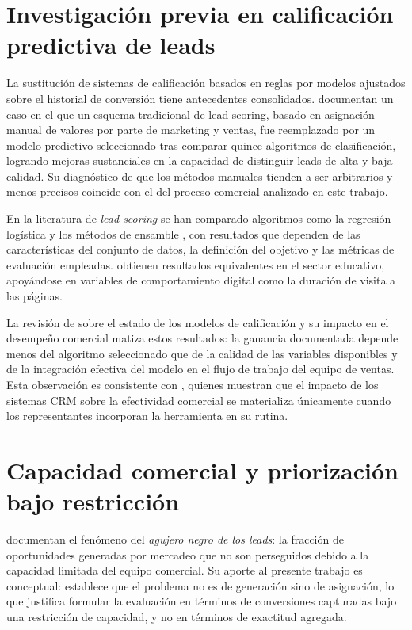 
\section{Investigación previa en calificación predictiva de leads}

La sustitución de sistemas de calificación basados en reglas por modelos ajustados
sobre el historial de conversión tiene antecedentes consolidados.
 documentan un caso en el que un esquema tradicional de lead scoring, basado en asignación manual de valores por parte de marketing y ventas, fue reemplazado por un modelo predictivo seleccionado tras comparar quince algoritmos de clasificación, logrando mejoras sustanciales en la capacidad de distinguir leads de alta y baja calidad. Su diagnóstico de que los métodos manuales tienden a ser arbitrarios y menos precisos coincide con el del proceso comercial analizado en este trabajo.

En la literatura de \emph{lead scoring} se han comparado algoritmos como la
regresión logística y los métodos de ensamble , con
resultados que dependen de las características del conjunto de datos, la
definición del objetivo y las métricas de evaluación empleadas.
 obtienen resultados equivalentes en el sector educativo,
apoyándose en variables de comportamiento digital como la duración de visita a las
páginas.

La revisión de  sobre el estado de los modelos de calificación y
su impacto en el desempeño comercial matiza estos resultados: la ganancia
documentada depende menos del algoritmo seleccionado que de la calidad de las
variables disponibles y de la integración efectiva del modelo en el flujo de
trabajo del equipo de ventas. Esta observación es consistente con
, quienes muestran que el impacto de los sistemas CRM sobre
la efectividad comercial se materializa únicamente cuando los representantes
incorporan la herramienta en su rutina.

\section{Capacidad comercial y priorización bajo restricción}

 documentan el fenómeno del \emph{agujero negro de los
leads}: la fracción de oportunidades generadas por mercadeo que no son perseguidos debido a la capacidad limitada del equipo comercial. Su aporte al
presente trabajo es conceptual: establece que el problema no es de generación sino
de asignación, lo que justifica formular la evaluación en términos de conversiones
capturadas bajo una restricción de capacidad, y no en términos de exactitud
agregada.

